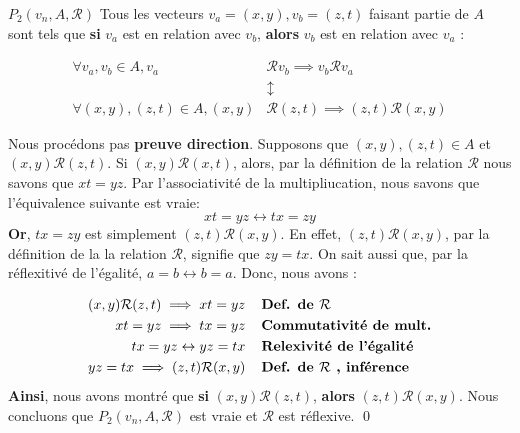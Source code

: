 \documentclass[16pt]{report}
\begin{document}
\begin{multicols*}{2}
            \begin{prop}{$P_2(v_n, A,\mathcal{R})$}{}
                Tous les vecteurs $v_a = (x, y), v_b = (z, t)$ faisant partie de $A$ sont tels que \textbf{si} 
                $v_a$ est en relation 
                avec $v_b$, \textbf{alors} $v_b$ est en relation avec $v_a$ : 

                \begin{align*}
                    \forall v_a, v_b \in A, v_a &\mathcal{R}v_b  \implies v_b\mathcal{R}v_a  \\ 
                                     &\updownarrow \\ 
                    \forall (x,y),(z, t) \in A, (x, y) &\mathcal{R}(z, t) \implies 
                                     (z, t) \mathcal{R} (x, y)
                \end{align*}
            \end{prop}

            \begin{prop}{}{}
                 Nous procédons pas \textbf{preuve direction}. Supposons que  
                 $(x, y), (z, t) \in A$ et $(x, y)\mathcal{R}(z, t)$. Si $(x, y)\mathcal{R}(x, t)$, alors, 
                 par la définition de la relation $\mathcal{R}$ nous savons que $xt = yz$. 
                 Par l'associativité de la multipliucation, nous savons que 
                 l'équivalence suivante est vraie: 
                 \[ xt = yz \leftrightarrow tx = zy \]
                 \textbf{Or}, $tx = zy$ est simplement $(z, t)\mathcal{R}(x, y)$. En effet, 
                 $(z, t)\mathcal{R}(x, y)$, par la définition de la la relation $\mathcal{R}$, signifie 
                 que $zy = tx$. On sait aussi que, par la réflexitivé de l'égalité, 
                 $a = b \leftrightarrow b = a$. Donc, nous avons : 

                 \begin{align*}
                     (x, y)\mathcal{R}(z, t) \implies xt = yz  & \textbf{\quad Def. de $\mathcal{R}$} \\   
                     xt = yz \implies tx = yz & \textbf{\quad Commutativité de mult.} \\ 
                     tx = yz \leftrightarrow yz = tx & \textbf{\quad Relexivité de l'égalité} \\
                     yz = tx \implies (z, t)\mathcal{R}(x,y) & \textbf{\quad Def. de $\mathcal{R}$ \text{,} inférence}   
                 \end{align*}
            \textbf{Ainsi}, nous avons montré que \textbf{si} $(x, y)\mathcal{R}(z, t)$, \textbf{alors} 
            $(z, t)\mathcal{R}(x, y)$. Nous concluons que $P_2(v_n, A, \mathcal{R})$ est vraie 
            et $\mathcal{R}$ est réflexive. \qed
            \end{prop}


\end{multicols*}
\end{document}
